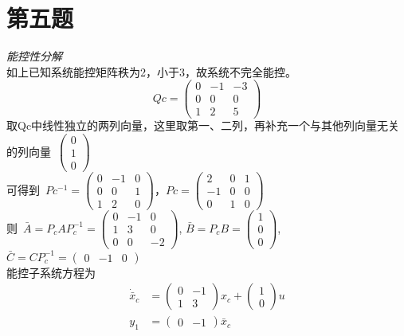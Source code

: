 \documentclass{article}
\begin{document}
\section*{第五题}
\emph{能控性分解}\\
如上已知系统能控矩阵秩为2，小于3，故系统不完全能控。\\
$$Qc= \left(\begin{array}{ccc} 0 & -1 & -3\\ 0 & 0 & 0\\ 1 & 2 & 5 \end{array}\right) $$
\mbox{取Qc中线性独立的两列向量，这里取第一、二列，再补充一个与其他列向量无关的列向量 }$\left(\begin{array}{c} 0\\ 1\\ 0 \end{array}\right)$ \\
\mbox{可得到 }$Pc^{-1}=\left(\begin{array}{ccc} 0 & -1 & 0\\ 0 & 0 & 1\\ 1 & 2 & 0 \end{array}\right)$，$Pc=\left(\begin{array}{ccc} 2 & 0 & 1\\ -1 & 0 & 0\\ 0 & 1 & 0 \end{array}\right)$ \\
\mbox{则 }$ \bar{A} =P_{c}AP_{c}^{-1}= \left(\begin{array}{ccc} 0 & -1 & 0\\ 1 & 3 & 0\\ 0 & 0 & -2 \end{array}\right)$,
$ \bar{B} =P_{c}B=\left(\begin{array}{c} 1\\ 0\\ 0 \end{array}\right)$,
$ \bar{C} =CP_{c}^{-1}=\left(\begin{array}{ccc} 0 & -1 & 0 \end{array}\right)$
\noindent \\
能控子系统方程为
\begin{align*}
\dot{\bar{x}}_{c} &=  \left(\begin{array}{cc} 0 & -1\\ 1 & 3 \end{array}\right)x_{c}+\left(\begin{array}{c} 1\\ 0 \end{array}\right)u \\ 
y_{1} &= \left(\begin{array}{cc} 0 & -1 \end{array}\right)\bar{x}_{c}
\end{align*}
\end{document}
